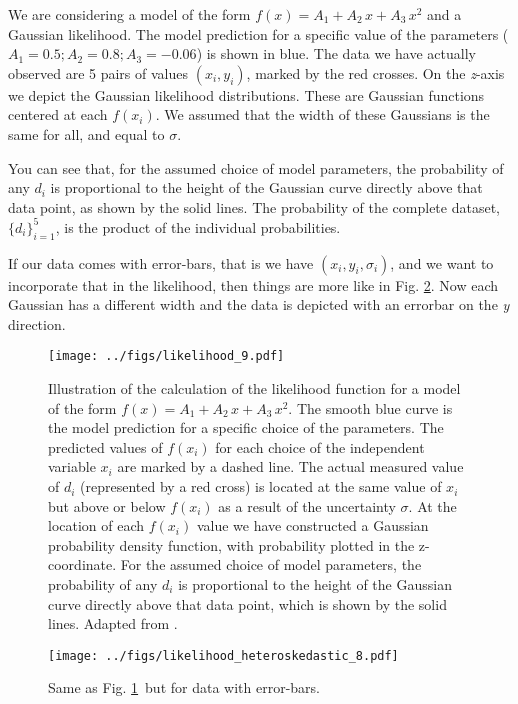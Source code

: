 \documentclass[a4paper,11pt]{article}
\begin{document}
We are considering a model of the form $f(x) = A_1 + A_2\,x + A_3\, x^2$ and a Gaussian likelihood.
The model prediction for a specific value of the parameters ($A_1 = 0.5; A_2 = 0.8; A_3 = -0.06$)
is shown in blue. 
The data we have actually observed are 5 pairs of values $(x_i, y_i)$, marked by the red crosses.
On the \emph{z}-axis we depict the Gaussian likelihood distributions.
These are Gaussian functions centered at each $f(x_i)$.
We assumed that the width of these Gaussians is the same for all, and equal to $\sigma$.

You can see that, for the assumed choice of model parameters, the probability of any $d_i$ is
proportional to the height of the Gaussian curve directly above that data point, as shown by the solid lines.
The probability of the complete dataset, $\{d_i\}_{i=1}^5$, is the product of the individual probabilities.

If our data comes with error-bars, that is we have $(x_i, y_i, \sigma_i)$, and we want to incorporate that
in the likelihood, then things are more like in Fig. \ref{fig:2nd_degree_like_heteroskedastic}.
Now each Gaussian has a different width and the data is depicted with an errorbar on the \emph{y} direction.


\begin{figure}
  \centering
  \texttt{[image: ../figs/likelihood\_9.pdf]}
  \caption{Illustration of the calculation of the likelihood function for a model of the form $f(x) = A_1 + A_2\,x + A_3\, x^2$.
           The smooth blue curve is the model prediction for a specific choice of the parameters. 
           The predicted values of $f(x_i)$ for each choice of the independent variable $x_i$ are marked by a dashed line.
           The actual measured value of $d_i$ (represented by a red cross) is located at the same value of $x_i$ but above or below $f(x_i)$ as a result of the uncertainty $\sigma$.
           At the location of each $f(x_i)$ value we have constructed a Gaussian probability density function, with probability plotted in the z-coordinate. 
           For the assumed choice of model parameters, the probability of any $d_i$ is proportional to the height of the Gaussian curve directly above that data point, which is shown by the solid lines.
           Adapted from \cite{Gregory2010}.}
  \label{fig:2nd_degree_like}
\end{figure}



\begin{figure}
  \centering
  \texttt{[image: ../figs/likelihood\_heteroskedastic\_8.pdf]}
  \caption{Same as Fig. \ref{fig:2nd_degree_like}\, but for data with error-bars.}
  \label{fig:2nd_degree_like_heteroskedastic}
\end{figure}
\end{document}
